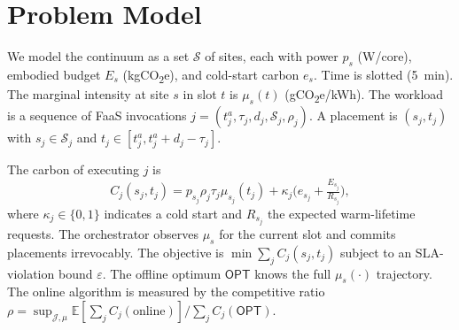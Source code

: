 \section{Problem Model}
\label{sec:model}

We model the continuum as a set $\mathcal{S}$ of sites, each with power $p_s$ (W/core), embodied budget $E_s$ (kgCO\textsubscript{2}e), and cold-start carbon $e_s$. Time is slotted (5~min). The marginal intensity at site $s$ in slot $t$ is $\mu_s(t)$ (gCO\textsubscript{2}e/kWh). The workload is a sequence of FaaS invocations $j=(t^a_j, \tau_j, d_j, \mathcal{S}_j, \rho_j)$. A placement is $(s_j,t_j)$ with $s_j\in\mathcal{S}_j$ and $t_j\in[t^a_j, t^a_j+d_j-\tau_j]$.

The carbon of executing $j$ is
\begin{equation}
C_j(s_j,t_j)=p_{s_j}\rho_j\tau_j\mu_{s_j}(t_j)+\kappa_j\big(e_{s_j}+\tfrac{E_{s_j}}{R_{s_j}}\big),
\label{eq:cost}
\end{equation}
where $\kappa_j\in\{0,1\}$ indicates a cold start and $R_{s_j}$ the expected warm-lifetime requests. The orchestrator observes $\mu_s$ for the current slot and commits placements irrevocably. The objective is $\min\sum_j C_j(s_j,t_j)$ subject to an SLA-violation bound $\varepsilon$. The offline optimum $\mathsf{OPT}$ knows the full $\mu_s(\cdot)$ trajectory. The online algorithm is measured by the competitive ratio $\rho = \sup_{\mathcal{J},\mu}\mathbb{E}[\sum_j C_j(\text{online})]/\sum_j C_j(\mathsf{OPT})$.
